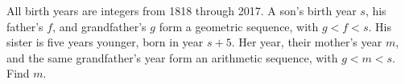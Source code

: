 All birth years are integers from 1818 through 2017. A son's birth year $s$, his father's $f$, and grandfather's $g$ form a geometric sequence, with $g<f<s$. His sister is five years younger, born in year $s+5$. Her year, their mother's year $m$, and the same grandfather's year form an arithmetic sequence, with $g<m<s$. Find $m$.
